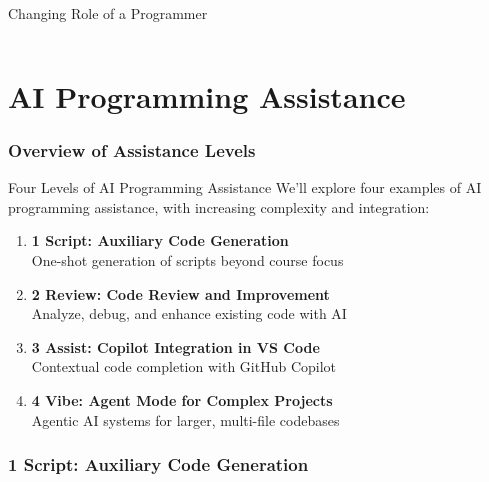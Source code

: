 \documentclass[xcolor=dvipsnames, aspectratio=169]{beamer}
\newcommand{\footername}{AI in Programming Education}
\newcommand{\setfooter}[2]{\renewcommand{\footername}{\href{#2}{#1}}}
\begin{document}
\begin{frame}{Changing Role of a Programmer}
\begin{columns}
  \end{columns}
\end{frame}


\part[AI Programming Assistance]{AI Programming Assistance}
\section{Overview of Assistance Levels}
\setfooter{AI Programming Assistance}{https://github.com/neu-ece-esl/ai-prog-workshop}

\begin{frame}{Four Levels of AI Programming Assistance}
  We'll explore four examples of AI programming assistance, with increasing complexity and integration:
  
  \begin{enumerate}
    \item \textbf{1 Script: Auxiliary Code Generation}\\
    One-shot generation of scripts beyond course focus
    
    \item \textbf{2 Review: Code Review and Improvement}\\
    Analyze, debug, and enhance existing code with AI
    
    \item \textbf{3 Assist: Copilot Integration in VS Code}\\
    Contextual code completion with GitHub Copilot
    
    \item \textbf{4 Vibe: Agent Mode for Complex Projects}\\
    Agentic AI systems for larger, multi-file codebases
  \end{enumerate}
\end{frame}

\section{1 Script: Auxiliary Code Generation}
\setfooter{1 Script}{https://github.com/neu-ece-esl/ai-prog-workshop/tree/main/1-script}
\end{document}
